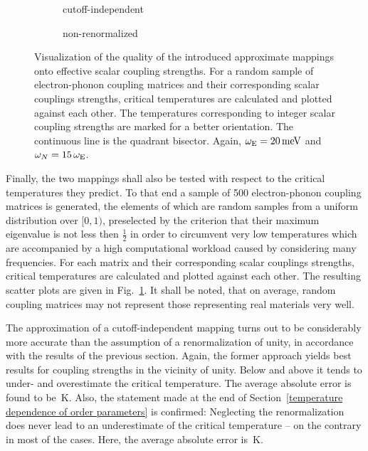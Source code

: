 \begin{figure}
    \small
    \begin{subfigure}{7cm}
        
        \caption{cutoff-independent}
    \end{subfigure}%
    \begin{subfigure}{7cm}
        
        \caption{non-renormalized}
    \end{subfigure}%
    \caption[Tests of effective scalar coupling strengths]{
        Visualization of the quality of the introduced approximate mappings onto
        effective scalar coupling strengths. For a random sample of
        electron-phonon coupling matrices and their corresponding scalar
        couplings strengths, critical temperatures are calculated and plotted
        against each other. The temperatures corresponding to integer scalar
        coupling strengths are marked for a better orientation. The continuous
        line is the quadrant bisector. Again, $\omega \sb{\text{E}} = 20 \, \mathrm{meV}$
        and $\omega_N = 15 \, \omega \sb{\text{E}}$.}
    \label{quality of the effective scalar coupling strengths}
\end{figure}
%
Finally, the two mappings shall also be tested with respect to the critical
temperatures they predict. To that end a sample of 500 electron-phonon coupling
matrices is generated, the elements of which are random samples from a uniform
distribution over $[0, 1)$, preselected by the criterion that their maximum
eigenvalue is not less then $\frac 1 2$ in order to circumvent very low
temperatures which are accompanied by a high computational workload caused by
considering many  frequencies. For each matrix and their
corresponding scalar couplings strengths, critical temperatures are calculated
and plotted against each other. The resulting scatter plots are given in
Fig.~\ref{quality of the effective scalar coupling strengths}. It shall be
noted, that on average, random coupling matrices may not represent those
representing real materials very well.

The approximation of a cutoff-independent mapping turns out to be considerably
more accurate than the assumption of a renormalization of unity, in accordance
with the results of the previous section. Again, the former approach yields best
results for coupling strengths in the vicinity of unity. Below and above it
tends to under- and overestimate the critical temperature. The average absolute
error is found to be \,K. Also, the statement made
at the end of Section~\ref{temperature dependence of order parameters} is
confirmed: Neglecting the renormalization does never lead to an underestimate of
the critical temperature -- on the contrary in most of the cases. Here, the
average absolute error is \,K.
